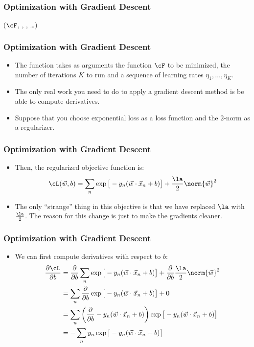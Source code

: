 \documentclass[trans,aspectratio=169]{beamer}
\begin{document}
\begin{frame}
  \frametitle{Optimization with Gradient Descent}
%
  {($\cF$, , , \dots)}
  {
\SETST{$\vz\kth$}{$\VARm{\vz\kpth} - \VARm{\eta}\VARm{\kth} \VARm{\vg\kth}$}
\ENDFOR
\RETURN \VARm{$\vz\Kth$}
}
\end{frame}

\begin{frame}
  \frametitle{Optimization with Gradient Descent}
\begin{itemize}
\item
The function takes as arguments the
function $\cF$ to be minimized, the number of iterations $K$ to run
and a sequence of learning rates $\eta_1, \dots, \eta_K$. 
\item
The only real work you need to do to apply a gradient descent method
is be able to compute derivatives. 
\item Suppose that you
choose exponential loss as a loss function and the $2$-norm as a
regularizer. 
\end{itemize}
\end{frame}

\begin{frame}
  \frametitle{Optimization with Gradient Descent}
\begin{itemize}
\item  Then, the regularized objective function is:
%
\begin{equation}
\cL(\vw,b) =
\sum_n 
  \exp\big[-y_n (\dotp{\vec w}{\vx_n}+b)\big] +
 \frac \la 2 \norm{\vw}^2
\end{equation}
%
\item The only ``strange'' thing in this objective is that we have replaced
$\la$ with $\frac \la 2$.  The reason for this change is just to make
the gradients cleaner.  
\end{itemize}
\end{frame}

\begin{frame}
  \frametitle{Optimization with Gradient Descent}
\begin{itemize}
\item
We can first compute derivatives with respect
to $b$:
%
\begin{align}
\frac {\partial\cL} {\partial b}
&= \partialby{b}\sum_n \exp\big[-y_n (\dotp{\vec w}{\vx_n}+b)\big] + \partialby{b}\frac \la 2 \norm{\vw}^2\\
&= \sum_n \partialby{b} \exp\big[ -y_n (\dotp{\vec w}{\vx_n}+b)\big] + 0\\
&= \sum_n \left( \partialby{b} -y_n (\dotp{\vec w}{\vx_n}+b) \right) \exp\big[ -y_n (\dotp{\vec w}{\vx_n}+b)\big]\\
&= - \sum_n y_n \exp\big[ -y_n (\dotp{\vec w}{\vx_n}+b)\big]
\end{align}
%
\end{itemize}
\end{frame}
\end{document}
